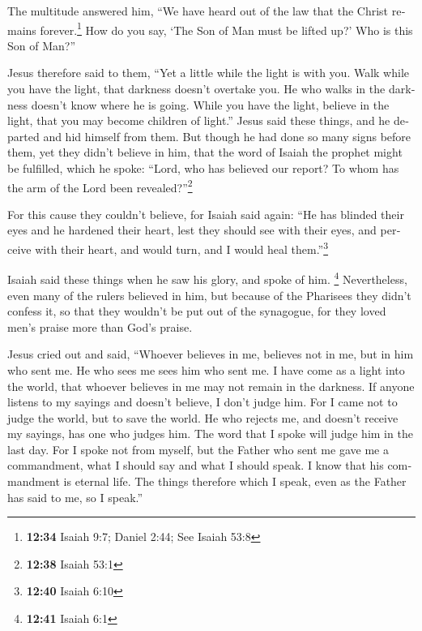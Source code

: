 \begin{paracol}{2}
\begin{otherlanguage}{english}
 The multitude answered him, ``We have heard out of the
law that the Christ remains forever.\footnote{\textbf{12:34} Isaiah 9:7;
  Daniel 2:44; See Isaiah 53:8} How do you say, `The Son of Man must be
lifted up?' Who is this Son of Man?''

 Jesus therefore said to them, ``Yet a little while the
light is with you. Walk while you have the light, that darkness doesn't
overtake you. He who walks in the darkness doesn't know where he is
going.  While you have the light, believe in the light,
that you may become children of light.'' Jesus said these things, and he
departed and hid himself from them.  But though he had
done so many signs before them, yet they didn't believe in him,
 that the word of Isaiah the prophet might be fulfilled,
which he spoke: ``Lord, who has believed our report? To whom has the arm
of the Lord been revealed?''\footnote{\textbf{12:38} Isaiah 53:1}

 For this cause they couldn't believe, for Isaiah said
again:  ``He has blinded their eyes and he hardened their
heart, lest they should see with their eyes, and perceive with their
heart, and would turn, and I would heal them.''\footnote{\textbf{12:40}
  Isaiah 6:10}

 Isaiah said these things when he saw his glory, and
spoke of him. \footnote{\textbf{12:41} Isaiah 6:1} 
Nevertheless, even many of the rulers believed in him, but because of
the Pharisees they didn't confess it, so that they wouldn't be put out
of the synagogue,  for they loved men's praise more than
God's praise.

 Jesus cried out and said, ``Whoever believes in me,
believes not in me, but in him who sent me.  He who sees
me sees him who sent me.  I have come as a light into the
world, that whoever believes in me may not remain in the darkness.
 If anyone listens to my sayings and doesn't believe, I
don't judge him. For I came not to judge the world, but to save the
world.  He who rejects me, and doesn't receive my
sayings, has one who judges him. The word that I spoke will judge him in
the last day.  For I spoke not from myself, but the
Father who sent me gave me a commandment, what I should say and what I
should speak.  I know that his commandment is eternal
life. The things therefore which I speak, even as the Father has said to
me, so I speak.''


\end{otherlanguage}
\end{paracol}

